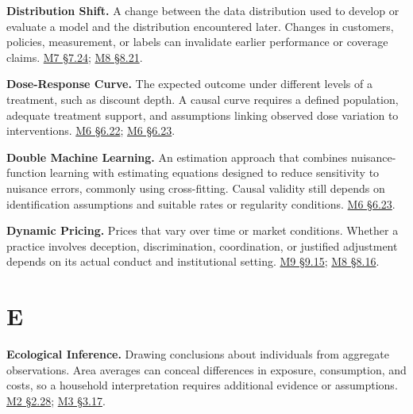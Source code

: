 \noindent\textbf{Distribution Shift.} A change between the data distribution used
to develop or evaluate a model and the distribution encountered later.
Changes in customers, policies, measurement, or labels can invalidate
earlier performance or coverage claims.
\href{Marketing_Analytics_Lecture_Notes.pdf\#M07-demand-intervals-and-the-distribution-of-forecast-errors}{M7
§7.24};
\href{Marketing_Analytics_Lecture_Notes.pdf\#M08-prediction-intervals-when-demand-changes}{M8
§8.21}.

\noindent\textbf{Dose-Response Curve.} The expected outcome under different
levels of a treatment, such as discount depth. A causal curve requires a
defined population, adequate treatment support, and assumptions linking
observed dose variation to interventions.
\href{Marketing_Analytics_Lecture_Notes.pdf\#M06-discount-depth-and-the-causal-response-curve}{M6
§6.22};
\href{Marketing_Analytics_Lecture_Notes.pdf\#M06-adjustment-for-selected-discount-intensity}{M6
§6.23}.

\noindent\textbf{Double Machine Learning.} An estimation approach that combines
nuisance-function learning with estimating equations designed to reduce
sensitivity to nuisance errors, commonly using cross-fitting. Causal
validity still depends on identification assumptions and suitable rates
or regularity conditions.
\href{Marketing_Analytics_Lecture_Notes.pdf\#M06-adjustment-for-selected-discount-intensity}{M6
§6.23}.

\noindent\textbf{Dynamic Pricing.} Prices that vary over time or market
conditions. Whether a practice involves deception, discrimination,
coordination, or justified adjustment depends on its actual conduct and
institutional setting.
\hyperref[M09-pricing-policy-what-conduct-is-being-evaluated]{M9
§9.15};
\href{Marketing_Analytics_Lecture_Notes.pdf\#M08-pricing-communication-customer-outcomes-and-regulatory-evidence}{M8
§8.16}.

\par{}
\hypertarget{module-e}{%
\section*{E}\label{module-e}}

\noindent\textbf{Ecological Inference.} Drawing conclusions about individuals
from aggregate observations. Area averages can conceal differences in
exposure, consumption, and costs, so a household interpretation requires
additional evidence or assumptions.
\href{Marketing_Analytics_Lecture_Notes.pdf\#M02-electricity-prices-household-bills-and-the-unit-of-harm}{M2
§2.28};
\href{Marketing_Analytics_Lecture_Notes.pdf\#M03-area-income-digital-usage-and-the-comparison-defined-by-controls}{M3
§3.17}.

